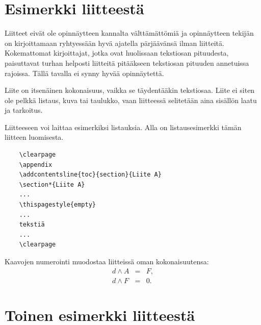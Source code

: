 \documentclass[finnish,12pt,a4paper,pdftex]{article}
\begin{document}
\section{Esimerkki liitteestä\label{LiiteA}}
\renewcommand{\theequation}{A\arabic{equation}}
\setcounter{equation}{0}  
\renewcommand{\thefigure}{A\arabic{figure}}
\setcounter{figure}{0}
\renewcommand{\thetable}{A\arabic{table}}
\setcounter{table}{0}

Liitteet eivät ole opinnäytteen kannalta välttämättömiä ja 
opinnäytteen tekijän on 
kirjoittamaan ryhtyessään hyvä ajatella pärjäävänsä ilman liitteitä.
Kokemattomat kirjoittajat, jotka ovat huolissaan
tekstiosan pituudesta, paisuttavat turhan 
helposti liitteitä pitääkseen tekstiosan pituuden annetuissa rajoissa.
Tällä tavalla ei synny hyvää opinnäytettä.   

Liite on itsenäinen kokonaisuus, vaikka se täydentääkin tekstiosaa.
Liite ei siten ole pelkkä listaus, kuva tai taulukko, vaan 
liitteessä selitetään aina sisällön laatu ja tarkoitus. 

Liitteeseen voi laittaa esimerkiksi listauksia. Alla on 
listausesimerkki tämän liitteen luomisesta. 

\begin{verbatim}
	\clearpage
	\appendix
	\addcontentsline{toc}{section}{Liite A}
	\section*{Liite A}
	...
	\thispagestyle{empty}
	...
	tekstiä
	...
	\clearpage
\end{verbatim}

Kaavojen numerointi muodostaa liitteissä oman kokonaisuutensa:
\begin{eqnarray}
d \wedge A  &=& F, \label{liitekaava1}\\
d \wedge F  &=& 0. \label{liitekaava2}
\end{eqnarray}


\clearpage
\section{Toinen esimerkki liitteestä\label{LiiteB}}
\end{document}
